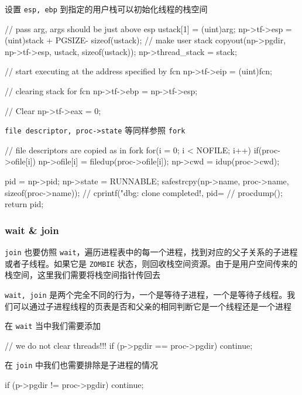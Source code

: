 设置 \texttt{esp, ebp} 到指定的用户栈可以初始化线程的栈空间

\begin{ccode}
	// pass arg, args should be just above esp
	ustack[1] = (uint)arg;
	np->tf->esp = (uint)stack + PGSIZE- sizeof(ustack);
	// make user stack
	copyout(np->pgdir, np->tf->esp, ustack, sizeof(ustack));
	np->thread_stack = stack;
		  
	// start executing at the address specified by fcn
	np->tf->eip = (uint)fcn;
		  
	// clearing stack for fcn
	np->tf->ebp = np->tf->esp;
		  
	// Clear %
	np->tf->eax = 0;
\end{ccode}

\texttt{file descriptor, proc->state} 等同样参照 \texttt{fork}

\begin{ccode}
	// file descriptors are copied as in fork
	for(i = 0; i < NOFILE; i++)
	if(proc->ofile[i])
	np->ofile[i] = filedup(proc->ofile[i]);
	np->cwd = idup(proc->cwd);
		   
	pid = np->pid;
	np->state = RUNNABLE;
	safestrcpy(np->name, proc->name, sizeof(proc->name));
	// cprintf("dbg: clone completed!, pid=%
	// procdump();
	return pid;
\end{ccode}

\subsubsection{wait & join}

\texttt{join} 也要仿照 \texttt{wait}，遍历进程表中的每一个进程，找到对应的父子关系的子进程或者子线程。如果它是 \texttt{ZOMBIE} 状态，则回收栈空间资源。由于是用户空间传来的栈空间，这里我们需要将栈空间指针传回去

\texttt{wait, join} 是两个完全不同的行为，一个是等待子进程，一个是等待子线程。我们可以通过子进程线程的页表是否和父亲的相同判断它是一个线程还是一个进程

在 \texttt{wait} 当中我们需要添加

\begin{ccode}
	// we do not clear threads!!!
	if (p->pgdir == proc->pgdir)
	continue;
\end{ccode}

在 \texttt{join} 中我们也需要排除是子进程的情况

\begin{ccode}
	if (p->pgdir != proc->pgdir)
	continue;
\end{ccode}

